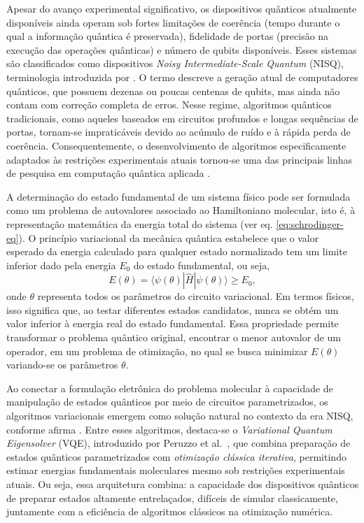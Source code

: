 Apesar do avanço experimental significativo,
os dispositivos quânticos atualmente disponíveis ainda operam sob
fortes limitações de coerência (tempo durante o qual a informação quântica é preservada),
fidelidade de portas (precisão na execução das operações quânticas)
e número de qubits disponíveis.
Esses sistemas são classificados como dispositivos
\textit{Noisy Intermediate-Scale Quantum} (NISQ),
terminologia introduzida por
\textcite{preskill2018nisq}.
O termo descreve a geração atual de computadores quânticos,
que possuem dezenas ou poucas centenas de qubits,
mas ainda não contam com correção completa de erros.
Nesse regime, algoritmos quânticos tradicionais, como aqueles baseados
em circuitos profundos e longas sequências de portas,
tornam-se impraticáveis devido ao acúmulo de ruído e à rápida perda de coerência.
Consequentemente, o desenvolvimento de algoritmos especificamente
adaptados às restrições experimentais atuais tornou-se uma das principais
linhas de pesquisa em computação quântica aplicada
\cite{bharti2021noisy}.

A determinação do estado fundamental de um sistema físico pode ser
formulada como um problema de autovalores associado ao Hamiltoniano
molecular, isto é, à representação matemática da energia total do sistema (ver eq. \eqref{eq:schrodinger-eq}).
O princípio variacional da mecânica quântica estabelece que o valor
esperado da energia calculado para qualquer estado normalizado
tem um limite inferior dado pela energia $E_0$ do estado fundamental, ou seja,
\begin{equation}
E(\theta)=\langle \psi(\theta)|\hat{H}|\psi(\theta)\rangle \geq E_{\text{0}},
\end{equation}
onde $\theta$ representa todos os parâmetros do circuito variacional.
Em termos físicos, isso significa que,
ao testar diferentes estados candidatos,
nunca se obtém um valor inferior à energia real do estado fundamental.
Essa propriedade permite transformar o problema quântico original,
encontrar o menor autovalor de um operador,
em um problema de otimização,
no qual se busca minimizar $E(\theta)$ variando-se os parâmetros $\theta$.

Ao conectar a formulação eletrônica do problema molecular
à capacidade de manipulação de estados quânticos por meio de
circuitos parametrizados,
os algoritmos variacionais emergem como solução natural
no contexto da era NISQ, conforme afirma \textcite{hidary2019quantum}.
Entre esses algoritmos, destaca-se o
\textit{Variational Quantum Eigensolver} (VQE),
introduzido por Peruzzo et al.~\cite{peruzzo2014variational},
que combina preparação de estados quânticos parametrizados
com \textit{otimização clássica iterativa},
permitindo estimar energias fundamentais moleculares
mesmo sob restrições experimentais atuais.
Ou seja, essa arquitetura combina:
a capacidade dos dispositivos quânticos de preparar estados
altamente entrelaçados,  difíceis de simular classicamente, juntamente
com a eficiência de algoritmos clássicos na otimização numérica.

